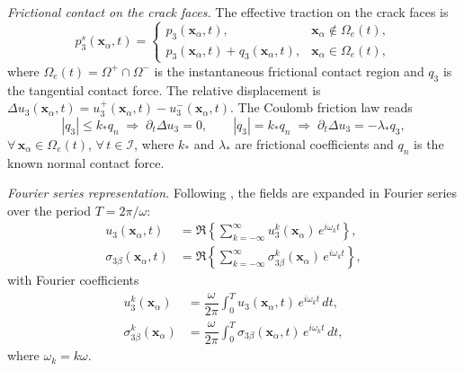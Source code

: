 \medskip
\emph{Frictional contact on the crack faces.} The effective traction on the crack faces is
\begin{equation}\label{GuzZozulyaEq42}
	p_3^{s}(\mathbf{x}_\alpha,t)
	=
	\begin{cases}
		p_3(\mathbf{x}_\alpha,t), & \mathbf{x}_\alpha\notin\Omega_e(t), \\[2pt]
		p_3(\mathbf{x}_\alpha,t)+q_3(\mathbf{x}_\alpha,t), & \mathbf{x}_\alpha\in\Omega_e(t),
	\end{cases}
\end{equation}
where $\Omega_e(t) = \Omega^+\cap\Omega^-$ is the instantaneous
frictional contact region and $q_3$ is the tangential contact force.
The relative displacement is
\(\Delta u_3(\mathbf{x}_\alpha,t)=u_3^+(\mathbf{x}_\alpha,t)-u_3^-(\mathbf{x}_\alpha,t)\).
The Coulomb friction law reads
\begin{equation}\label{GuzZozulyaEq43}
	|q_3| \le k_* q_n \;\Rightarrow\; \partial_t \Delta u_3 = 0,
	\qquad
	|q_3| = k_* q_n \;\Rightarrow\; \partial_t \Delta u_3 = -\lambda_* q_3,
\end{equation}
$\forall\,\mathbf{x}_\alpha\in\Omega_e(t)$, $\forall\,t\in\mathcal{I}$,
where $k_*$ and $\lambda_*$ are frictional coefficients and
$q_n$ is the known normal contact force.

\medskip
\emph{Fourier series representation.} Following \cite{GuzZozulyaRef31}, the fields are expanded in Fourier series
over the period $T=2\pi/\omega$:
\begin{equation}\label{GuzZozulyaEq44}
	\begin{aligned}
		u_3(\mathbf{x}_\alpha,t)
		&= \Re\left\{\sum_{k=-\infty}^{\infty}
		u_3^k(\mathbf{x}_\alpha)\,e^{i\omega_k t} \right\},\\
		\sigma_{3\beta}(\mathbf{x}_\alpha,t)
		&= \Re\left\{\sum_{k=-\infty}^{\infty}
		\sigma_{3\beta}^k(\mathbf{x}_\alpha)\,e^{i\omega_k t} \right\},
	\end{aligned}
\end{equation}
with Fourier coefficients
\begin{equation}\label{GuzZozulyaEq45}
	\begin{array}{ll}
		u_3^k(\mathbf{x}_\alpha)
		&= \dfrac{\omega}{2\pi}\displaystyle\int_0^T u_3(\mathbf{x}_\alpha,t)\,e^{i\omega_k t}\,dt,\\
		\sigma_{3\beta}^k(\mathbf{x}_\alpha)
		&= \dfrac{\omega}{2\pi}\displaystyle\int_0^T \sigma_{3\beta}(\mathbf{x}_\alpha,t)\,e^{i\omega_k t}\,dt,
	\end{array}
\end{equation}
where $\omega_k = k\omega$.  

